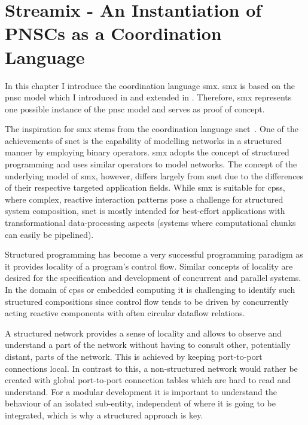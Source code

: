 %
\chapter{Streamix - An Instantiation of PNSCs as a Coordination Language}
\label{chap_smx}
In this chapter I introduce the coordination language \gls*{smx}.
\Gls*{smx} is based on the \gls{pnsc} model which I introduced in \Chap{\ref{chap_ecm}} and extended in \Chap{\ref{chap_tcm}}.
Therefore, \gls*{smx} represents one possible instance of the \gls{pnsc} model and serves as proof of concept.

The inspiration for \gls*{smx} stems from the coordination language \gls*{snet}~\cite{grelck2010}.
One of the achievements of \gls*{snet} is the capability of modelling networks in a structured manner by employing binary operators.
\Gls*{smx} adopts the concept of structured programming and uses similar operators to model networks.
The concept of the underlying model of \gls*{smx}, however, differs largely from \gls*{snet} due to the differences of their respective targeted application fields.
While \gls*{smx} is suitable for \glspl{cps}, where complex, reactive interaction patterns pose a challenge for structured system composition, \gls*{snet} is mostly intended for best-effort applications with transformational data-processing aspects (\eg systems where computational chunks can easily be pipelined).

Structured programming has become a very successful programming paradigm as it provides locality of a program's control flow.
Similar concepts of locality are desired for the specification and development of concurrent and parallel systems.
In the domain of \glspl{cps} or embedded computing it is challenging to identify such structured compositions since control flow tends to be driven by concurrently acting reactive components with often circular dataflow relations.

A structured network provides a sense of locality and allows to observe and understand a part of the network without having to consult other, potentially distant, parts of the network.
This is achieved by keeping port-to-port connections local.
In contrast to this, a non-structured network would rather be created with global port-to-port connection tables which are hard to read and understand.
For a modular development it is important to understand the behaviour of an isolated sub-entity, independent of where it is going to be integrated, which is why a structured approach is key.

